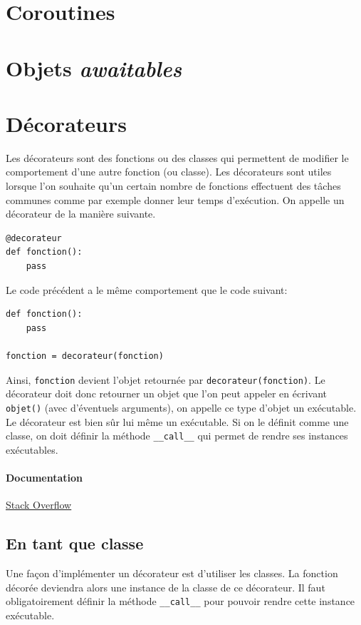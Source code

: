 \documentclass[a4paper, 10pt]{article}
\begin{document}
\section{Coroutines}
\section{Objets \emph{awaitables}}


\section{Décorateurs}
Les décorateurs sont des fonctions ou des classes qui permettent de modifier le comportement d'une autre fonction (ou classe). Les décorateurs sont utiles lorsque l'on souhaite qu'un certain nombre de fonctions effectuent des tâches communes comme par exemple donner leur temps d'exécution. On appelle un décorateur de la manière suivante.

\begin{verbatim}
@decorateur
def fonction():
    pass
\end{verbatim}

Le code précédent a le même comportement que le code suivant:

\begin{verbatim}
def fonction():
    pass

fonction = decorateur(fonction)
\end{verbatim}

Ainsi, \texttt{fonction} devient l'objet retournée par \texttt{decorateur(fonction)}. Le décorateur doit donc retourner un objet que l'on peut appeler en écrivant \texttt{objet()} (avec d'éventuels arguments), on appelle ce type d'objet un \og exécutable\fg{}. Le décorateur est bien sûr lui même un exécutable. Si on le définit comme une classe, on doit définir la méthode \texttt{__call__} qui permet de rendre ses instances exécutables.

\paragraph{Documentation} \href{https://stackoverflow.com/questions/739654/how-to-make-a-chain-of-function-decorators/1594484#1594484}{Stack Overflow}

\subsection{En tant que classe}
Une façon d'implémenter un décorateur est d'utiliser les classes. La fonction décorée deviendra alors une instance de la classe de ce décorateur. Il faut obligatoirement définir la méthode \texttt{__call__} pour pouvoir rendre cette instance exécutable.
\end{document}
